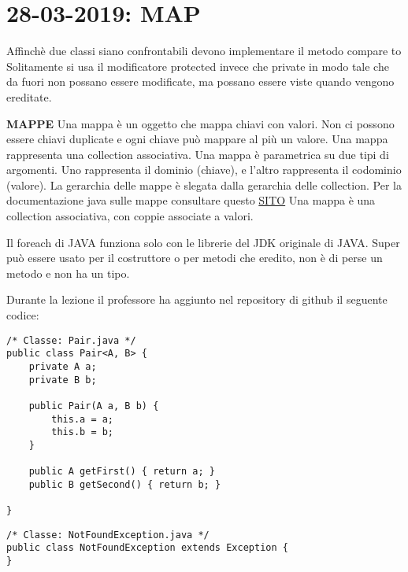 

\newpage
\section{28-03-2019: MAP}
\noindent Affinchè due classi siano confrontabili devono implementare il metodo compare to \newline
Solitamente si usa il modificatore protected invece che private in modo tale che da fuori non possano essere modificate, ma possano essere viste quando vengono ereditate. \newline

\noindent \textbf{MAPPE}\newline
Una mappa è un oggetto che mappa chiavi con valori. Non ci possono essere chiavi duplicate e ogni chiave può mappare al più un valore. \newline
Una mappa rappresenta una collection associativa. \newline
Una mappa è parametrica su due tipi di argomenti. Uno rappresenta il dominio (chiave), e l'altro rappresenta il codominio (valore). La gerarchia delle mappe è slegata dalla gerarchia delle collection. \newline
Per la documentazione java sulle mappe consultare questo \href{https://docs.oracle.com/javase/8/docs/api/java/util/Map.html }{SITO} \newline
Una mappa è una collection associativa, con coppie associate a valori.

\noindent Il foreach di JAVA funziona solo con le librerie del JDK originale di JAVA.\newline
Super può essere usato per il costruttore o per metodi che eredito, non è di perse un metodo e non ha un tipo.

\noindent Durante la lezione il professore ha aggiunto nel repository di github il seguente codice: 


\begin{lstlisting}[basicstyle=\small,]
/* Classe: Pair.java */
public class Pair<A, B> {
    private A a;
    private B b;

    public Pair(A a, B b) {
        this.a = a;
        this.b = b;
    }

    public A getFirst() { return a; }
    public B getSecond() { return b; }

}
\end{lstlisting}

\begin{lstlisting}[basicstyle=\small,]
/* Classe: NotFoundException.java */
public class NotFoundException extends Exception {
}
\end{lstlisting}


